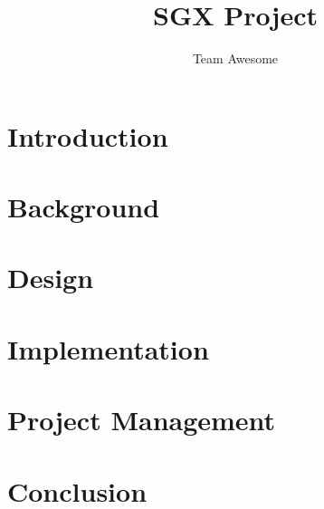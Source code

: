 \documentclass{article}
\title{SGX Project}
\author{Team Awesome}
\begin{document}
\maketitle

\newpage

\begin{abstract}
	
\end{abstract}

\newpage

\tableofcontents

\newpage

\section{Introduction}

\newpage

\section{Background}
\label{sec:background}

\newpage

\section{Design}
\label{sec:design}

\newpage

\section{Implementation}
\label{sec:implementation}

\newpage

\section{Project Management}
\label{sec:projectmgmt}

\newpage

\section{Conclusion}
\label{sec:conclusion}

\newpage

\printbibliography
\end{document}
